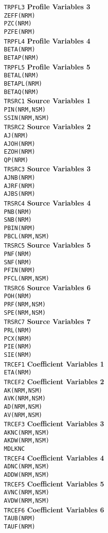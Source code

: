 \documentclass[11pt]{jarticle}
\newcommand{\commonBlock}[2]
{\texttt{#1} \> \> \> \textbf{#2} \\}
\newcommand{\commonVar}[3]
{\> \texttt{#1} \> [#2] \> #3 \\}
\begin{document}
\begin{tabbing}
\commonBlock{TRPFL3}{Profile Variables 3}
\commonVar{ZEFF(NRM)}{D}{}
\commonVar{PZC(NRM)}{D}{}
\commonVar{PZFE(NRM)}{D}{}

\commonBlock{TRPFL4}{Profile Variables 4}
\commonVar{BETA(NRM)}{D}{}
\commonVar{BETAP(NRM)}{D}{}

\commonBlock{TRPFL5}{Profile Variables 5}
\commonVar{BETAL(NRM)}{D}{}
\commonVar{BETAPL(NRM)}{D}{}
\commonVar{BETAQ(NRM)}{D}{}

\commonBlock{TRSRC1}{Source Variables 1}
\commonVar{PIN(NRM,NSM)}{D}{}
\commonVar{SSIN(NRM,NSM)}{D}{}

\commonBlock{TRSRC2}{Source Variables 2}
\commonVar{AJ(NRM)}{D}{}
\commonVar{AJOH(NRM)}{D}{}
\commonVar{EZOH(NRM)}{D}{}
\commonVar{QP(NRM)}{D}{}

\commonBlock{TRSRC3}{Source Variables 3}
\commonVar{AJNB(NRM)}{D}{}
\commonVar{AJRF(NRM)}{D}{}
\commonVar{AJBS(NRM)}{D}{}

\commonBlock{TRSRC4}{Source Variables 4}
\commonVar{PNB(NRM)}{D}{}
\commonVar{SNB(NRM)}{D}{}
\commonVar{PBIN(NRM)}{D}{}
\commonVar{PBCL(NRM,NSM)}{D}{}

\commonBlock{TRSRC5}{Source Variables 5}
\commonVar{PNF(NRM)}{D}{}
\commonVar{SNF(NRM)}{D}{}
\commonVar{PFIN(NRM)}{D}{}
\commonVar{PFCL(NRM,NSM)}{D}{}

\commonBlock{TRSRC6}{Source Variables 6}
\commonVar{POH(NRM)}{D}{}
\commonVar{PRF(NRM,NSM)}{D}{}
\commonVar{SPE(NRM,NSM)}{D}{}

\commonBlock{TRSRC7}{Source Variables 7}
\commonVar{PRL(NRM)}{D}{}
\commonVar{PCX(NRM)}{D}{}
\commonVar{PIE(NRM)}{D}{}
\commonVar{SIE(NRM)}{D}{}


\commonBlock{TRCEF1}{Coefficient Variables 1}
\commonVar{ETA(NRM)}{D}{}

\commonBlock{TRCEF2}{Coefficient Variables 2}
\commonVar{AK(NRM,NSM)}{D}{}
\commonVar{AVK(NRM,NSM)}{D}{}
\commonVar{AD(NRM,NSM)}{D}{}
\commonVar{AV(NRM,NSM)}{D}{}

\commonBlock{TRCEF3}{Coefficient Variables 3}
\commonVar{AKNC(NRM,NSM)}{D}{}
\commonVar{AKDW(NRM,NSM)}{D}{}
\commonVar{MDLKNC}{I}{}

\commonBlock{TRCEF4}{Coefficient Variables 4}
\commonVar{ADNC(NRM,NSM)}{D}{}
\commonVar{ADDW(NRM,NSM)}{D}{}

\commonBlock{TRCEF5}{Coefficient Variables 5}
\commonVar{AVNC(NRM,NSM)}{D}{}
\commonVar{AVDW(NRM,NSM)}{D}{}

\commonBlock{TRCEF6}{Coefficient Variables 6}
\commonVar{TAUB(NRM)}{D}{}
\commonVar{TAUF(NRM)}{D}{}


\end{tabbing}
\end{document}
